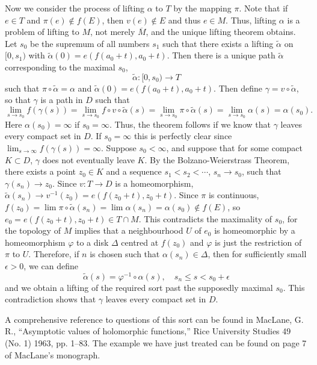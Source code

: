 \documentclass[a4paper,11pt]{article}
\begin{document}
\begin{myproof}
  Now we consider the process of lifting $\alpha$ to $T$ by the
  mapping $\pi$.  Note that if $e \in T$ and $\pi (e) \notin f(E)$,
  then $v(e) \notin E$ and thus $e \in M$.  Thus, lifting $\alpha$ is
  a problem of lifting to $M$, not merely $\overline{M}$, and the
  unique lifting theorem obtains.  Let $s_0$ be the supremum of all
  numbers $s_1$ such that there exists a lifting $\widetilde{\alpha}$
  on $[0, s_1)$ with $\widetilde{\alpha}(0) = e(f(a_0 + t), a_0 +
  t)$.  Then there is a unique path $\widetilde{\alpha}$ corresponding
  to the maximal $s_0$,
  $$
  \widetilde{\alpha} : [0, s_0) \to T
  $$
  such that $\pi \circ \widetilde{\alpha} = \alpha$ and
  $\widetilde{\alpha}(0) = e(f(a_0 + t), a_0 + t)$.   Then define
  $\gamma = v \circ \widetilde{\alpha}$, so that $\gamma$ is a path in
  $D$ such that
  $$
  \lim_{s \to s_0} f(\gamma(s))
  = \lim_{s \to s_0} f \circ v \circ \widetilde{\alpha}(s)
  = \lim_{s \to s_0} \pi \circ \widetilde{\alpha}(s)
  = \lim_{s \to s_0} \alpha(s)
  = \alpha(s_0).
  $$
  Here $\alpha(s_0) = \infty$ if $s_0 = \infty$.  Thus, the theorem
  follows if we know that $\gamma$ leaves every compact set in $D$.
  If $s_0 = \infty$ this is perfectly clear since $\lim_{s \to \infty}
  f(\gamma(s)) = \infty$.  Suppose $s_0 < \infty$, and suppose that
  for some compact $K \subset D$, $\gamma$ does not eventually leave
  $K$.  By the Bolzano-Weierstrass Theorem, there exists a point $z_0
  \in K$ and a sequence $s_1 < s_2 < \cdots$, $s_n \to s_0$, such that
  $\gamma(s_n) \to z_0$.  Since $v : T \to D$ is a homeomorphism,
  $\widetilde{\alpha}(s_n) \to v^{-1}(z_0) = e(f(z_0+t), z_0+t)$.
  Since $\pi$ is continuous, $f(z_0) = \lim \pi \circ
  \widetilde{\alpha}(s_n) = \lim \alpha(s_n) = \alpha(s_0) \notin
  f(E)$, so $e_0 = e(f(z_0 + t), z_0 + t) \in T \cap M$.  This
  contradicts the maximality of $s_0$, for the topology of $M$ implies
  that a neighbourhood $U$ of $e_0$ is homeomorphic by a homeomorphism
  $\varphi$ to a disk $\Delta$ centred at $f(z_0)$ and $\varphi$ is
  just the restriction of $\pi$ to $U$.  Therefore, if $n$ is chosen
  such that $\alpha(s_n) \in \Delta$, then for sufficiently small
  $\epsilon > 0$, we can define
  $$
  \widetilde{\alpha}(s) = \varphi^{-1} \circ \alpha(s),\quad
  s_n \le s < s_0 + \epsilon
  $$
  and we obtain a lifting of the required sort past the 
  supposedly maximal $s_0$.  This contradiction shows that $\gamma$
  leaves every compact set in $D$.
\end{myproof}

A comprehensive reference to questions of this sort can be found in
MacLane, G. R., ``Asymptotic values of holomorphic functions,'' Rice
University Studies 49 (No. 1) 1963, pp. 1--83.  The example we have
just treated can be found on page 7 of MacLane's monograph.
\end{document}
